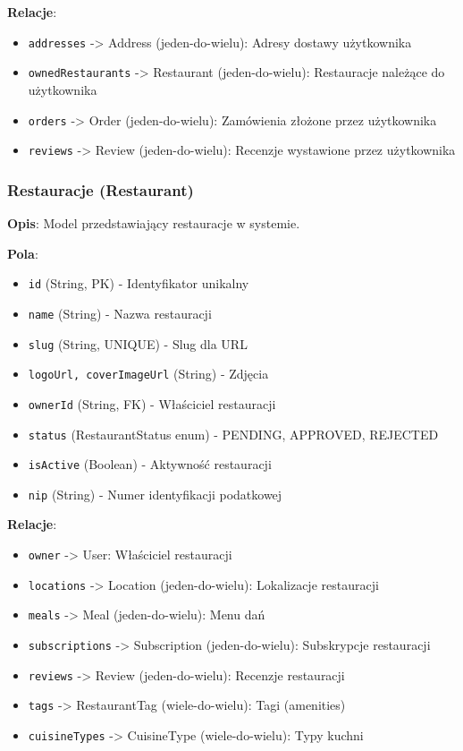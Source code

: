 ﻿\documentclass[12pt,a4paper,utf-8]{article}
\begin{document}
\textbf{Relacje}:
\begin{itemize}
    \item \texttt{addresses} -> Address (jeden-do-wielu): Adresy dostawy użytkownika
    \item \texttt{ownedRestaurants} -> Restaurant (jeden-do-wielu): Restauracje należące do użytkownika
    \item \texttt{orders} -> Order (jeden-do-wielu): Zamówienia złożone przez użytkownika
    \item \texttt{reviews} -> Review (jeden-do-wielu): Recenzje wystawione przez użytkownika
\end{itemize}

\subsubsection{Restauracje (Restaurant)}

\textbf{Opis}: Model przedstawiający restauracje w systemie.

\textbf{Pola}:
\begin{itemize}
    \item \texttt{id} (String, PK) - Identyfikator unikalny
    \item \texttt{name} (String) - Nazwa restauracji
    \item \texttt{slug} (String, UNIQUE) - Slug dla URL
    \item \texttt{logoUrl, coverImageUrl} (String) - Zdjęcia
    \item \texttt{ownerId} (String, FK) - Właściciel restauracji
    \item \texttt{status} (RestaurantStatus enum) - PENDING, APPROVED, REJECTED
    \item \texttt{isActive} (Boolean) - Aktywność restauracji
    \item \texttt{nip} (String) - Numer identyfikacji podatkowej
\end{itemize}

\textbf{Relacje}:
\begin{itemize}
    \item \texttt{owner} -> User: Właściciel restauracji
    \item \texttt{locations} -> Location (jeden-do-wielu): Lokalizacje restauracji
    \item \texttt{meals} -> Meal (jeden-do-wielu): Menu dań
    \item \texttt{subscriptions} -> Subscription (jeden-do-wielu): Subskrypcje restauracji
    \item \texttt{reviews} -> Review (jeden-do-wielu): Recenzje restauracji
    \item \texttt{tags} -> RestaurantTag (wiele-do-wielu): Tagi (amenities)
    \item \texttt{cuisineTypes} -> CuisineType (wiele-do-wielu): Typy kuchni
\end{itemize}
\end{document}
